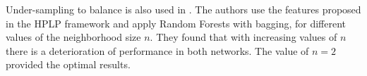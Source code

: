 \documentclass{acm_proc_article-sp}
\begin{document}
Under-sampling to balance is also used in \cite{Lichtenwalter:2010:NPM:1835804.1835837}. The authors use the features proposed in the HPLP framework and apply Random Forests with bagging, for different values of the neighborhood size $n$. They found that with increasing values of $n$ there is a deterioration of performance in both networks. The value of $n=2$ provided the optimal results.
 



\end{document}
